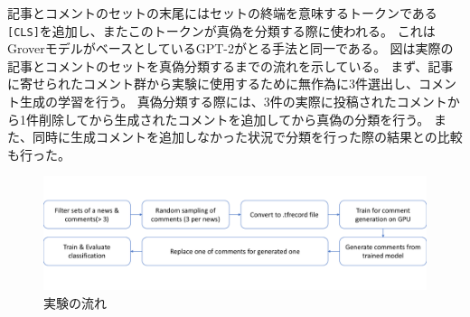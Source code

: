 記事とコメントのセットの末尾にはセットの終端を意味するトークンである\texttt{[CLS]}を追加し、またこのトークンが真偽を分類する際に使われる。
これはGroverモデルがベースとしているGPT-2がとる手法\cite{Radford_GPT2}と同一である。
図は実際の記事とコメントのセットを真偽分類するまでの流れを示している。
まず、記事に寄せられたコメント群から実験に使用するために無作為に3件選出し、コメント生成の学習を行う。
真偽分類する際には、3件の実際に投稿されたコメントから1件削除してから生成されたコメントを追加してから真偽の分類を行う。
また、同時に生成コメントを追加しなかった状況で分類を行った際の結果との比較も行った。

\begin{figure}[t]
    \centering
    \includegraphics[width=0.8\linewidth,pagebox=cropbox,clip]{images/fig_process.pdf}
    \caption{実験の流れ}
    \label{fig:process}
\end{figure}
